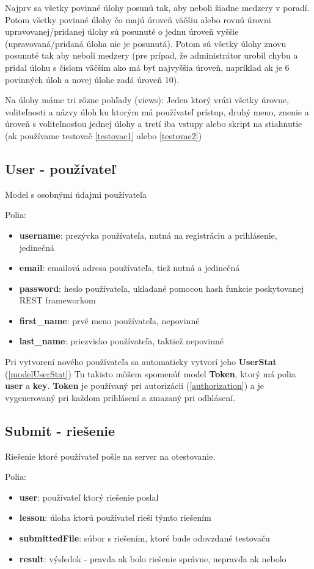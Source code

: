 Najprv sa všetky povinné úlohy posunú tak, aby neboli žiadne medzery v poradí.
Potom všetky povinné úlohy čo majú úroveň väčšiu alebo rovnú úrovni upravovanej/pridanej
úlohy sú posunuté o jednu úroveň vyššie (upravovaná/pridaná úloha nie je posunutá).
Potom sú všetky úlohy znovu posunuté tak aby neboli medzery (pre prípad, že administrátor
urobil chybu a pridal úlohu s číslom väčším ako má byť najvyššia úroveň, napríklad
ak je 6 povinných úloh a novej úlohe zadá úroveň 10).

Na úlohy máme tri rôzne pohľady (views): Jeden ktorý vráti všetky úrovne, voliteľnosti a názvy úloh ku ktorým má
používateľ prístup, druhý meno, znenie a úroveň s voliteľnosťou jednej úlohy a tretí
iba vstupy alebo skript na stiahnutie (ak používame testovač \ref{testovac1} alebo \ref{testovac2})

\subsection{User - používateľ}
Model s osobnými údajmi používateľa

Polia:
\begin{itemize}
\item \textbf{username}: prezývka používateľa, nutná na registráciu a prihlásenie, jedinečná
\item \textbf{email}: emailová adresa používateľa, tiež nutná a jedinečná
\item \textbf{password}: heslo používateľa, ukladané pomocou hash funkcie poskytovanej
                        REST frameworkom
\item \textbf{first\_name}: prvé meno používateľa, nepovinné
\item \textbf{last\_name}: priezvisko používateľa, taktiež nepovinné
\end{itemize}

Pri vytvorení nového používateľa sa automaticky vytvorí jeho \textbf{UserStat} (\ref{modelUserStat})
\newline
Tu takisto môžem spomenúť model \textbf{Token}, ktorý má polia \textbf{user} a \textbf{key}.
\textbf{Token} je používaný pri autorizácii (\ref{authorization}) a je vygenerovaný
pri každom prihlásení a zmazaný pri odhlásení.
\newpage
\subsection{Submit - riešenie}
Riešenie ktoré používateľ pošle na server na otestovanie.

Polia:
\begin{itemize}
\item \textbf{user}: používateľ ktorý riešenie poslal
\item \textbf{lesson}: úloha ktorú používateľ rieši týmto riešením
\item \textbf{submittedFile}: súbor s riešením, ktoré bude odovzdané testovaču
\item \textbf{result}: výsledok - pravda ak bolo riešenie správne, nepravda ak nebolo
\end{itemize}

